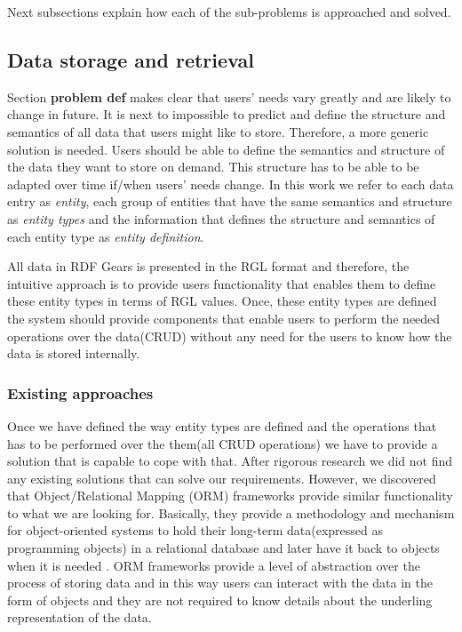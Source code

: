 Next subsections explain how each of the sub-problems is approached and solved.

\subsection{Data storage and retrieval}

Section \textbf{problem def} makes clear that users' needs vary greatly and are likely to change in future. It is next to impossible to predict and define the structure and semantics of all data that users might like to store. Therefore, a more generic solution is needed. Users should be able to define the semantics and structure of the data they want to store on demand. This structure has to be able to be adapted over time if/when users' needs change. In this work we refer to each data entry as \textit{entity}, each group of entities that have the same semantics and structure as \textit{entity types} and the information that defines the structure and semantics of each entity type as \textit{entity definition}.

All data in RDF Gears is presented in the RGL format and therefore, the intuitive approach is to provide users functionality that enables them to define these entity types in terms of RGL values. Once, these entity types are defined the system should provide components that enable users to perform the needed operations over the data(CRUD) without any need for the users to know how the data is stored internally.

\subsubsection{Existing approaches}

Once we have defined the way entity types are defined and the operations that has to be performed over the them(all CRUD operations) we have to provide a solution that is capable to cope with that. After rigorous research we did not find any existing solutions that can solve our requirements. However, we discovered that Object/Relational Mapping (ORM) frameworks provide similar functionality to what we are looking for. Basically, they provide a methodology and mechanism for object-oriented systems to hold their long-term data(expressed as programming objects) in a relational database and later have it back to objects when it is needed \cite{Neil}. ORM frameworks provide a level of abstraction over the process of storing data and in this way users can interact with the data in the form of objects and they are not required to know details about the underling representation of the data. 

